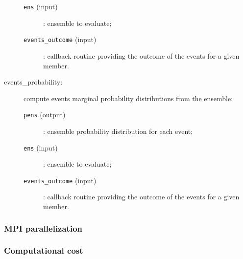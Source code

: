 \documentclass[11pt]{article}
\begin{document}
\begin{description}
\begin{description}
  \item[{\tt ens} (input)]: ensemble to evaluate;
  \item[{\tt events\_outcome} (input)]: callback routine providing the outcome
                                        of the events for a given member.
  \end{description}
\item[events\_probability:] compute events marginal probability distributions from the ensemble:
  \begin{description}
  \item[{\tt pens} (output)]: ensemble probability distribution for each event;
  \item[{\tt ens} (input)]: ensemble to evaluate;
  \item[{\tt events\_outcome} (input)]: callback routine providing the outcome
                                        of the events for a given member.
  \end{description}
\end{description}

\subsubsection*{MPI parallelization}

\subsubsection*{Computational cost}
\end{document}
